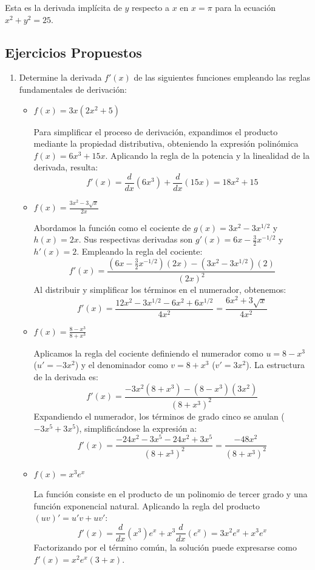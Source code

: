 \documentclass[12pt]{article}
\begin{document}
{Esta es la derivada implícita de \( y \) respecto a \( x \) en \( x = \pi \) para la ecuación \( x^2 + y^2 = 25 \).

\subsection{Ejercicios Propuestos}

\begin{enumerate}
\item Determine la derivada $f'(x)$ de las siguientes funciones empleando las reglas fundamentales de derivación:

\begin{itemize}
    \item[(a)] $f(x) = 3x(2x^2 + 5)$
    
    Para simplificar el proceso de derivación, expandimos el producto mediante la propiedad distributiva, obteniendo la expresión polinómica $f(x) = 6x^3 + 15x$. Aplicando la regla de la potencia y la linealidad de la derivada, resulta:
    \[
    f'(x) = \frac{d}{dx}(6x^3) + \frac{d}{dx}(15x) = 18x^2 + 15
    \]

    \item[(b)] $f(x) = \frac{3x^2 - 3\sqrt{x}}{2x}$
    
    Abordamos la función como el cociente de $g(x) = 3x^2 - 3x^{1/2}$ y $h(x) = 2x$. Sus respectivas derivadas son $g'(x) = 6x - \frac{3}{2}x^{-1/2}$ y $h'(x) = 2$. Empleando la regla del cociente:
    \[
    f'(x) = \frac{(6x - \frac{3}{2}x^{-1/2})(2x) - (3x^2 - 3x^{1/2})(2)}{(2x)^2}
    \]
    Al distribuir y simplificar los términos en el numerador, obtenemos:
    \[
    f'(x) = \frac{12x^2 - 3x^{1/2} - 6x^2 + 6x^{1/2}}{4x^2} = \frac{6x^2 + 3\sqrt{x}}{4x^2}
    \]

    \item[(c)] $f(x) = \frac{8-x^3}{8+x^3}$
    
    Aplicamos la regla del cociente definiendo el numerador como $u = 8-x^3$ ($u' = -3x^2$) y el denominador como $v = 8+x^3$ ($v' = 3x^2$). La estructura de la derivada es:
    \[
    f'(x) = \frac{-3x^2(8+x^3) - (8-x^3)(3x^2)}{(8+x^3)^2}
    \]
    Expandiendo el numerador, los términos de grado cinco se anulan ($-3x^5 + 3x^5$), simplificándose la expresión a:
    \[
    f'(x) = \frac{-24x^2 - 3x^5 - 24x^2 + 3x^5}{(8+x^3)^2} = \frac{-48x^2}{(8+x^3)^2}
    \]

    \item[(d)] $f(x) = x^3 e^x$
    
    La función consiste en el producto de un polinomio de tercer grado y una función exponencial natural. Aplicando la regla del producto $(uv)' = u'v + uv'$:
    \[
    f'(x) = \frac{d}{dx}(x^3)e^x + x^3\frac{d}{dx}(e^x) = 3x^2 e^x + x^3 e^x
    \]
    Factorizando por el término común, la solución puede expresarse como $f'(x) = x^2 e^x(3+x)$.


\end{itemize}
\end{enumerate}}
\end{document}
